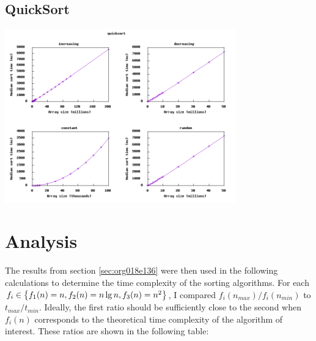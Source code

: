 \documentclass[11pt]{article}
\let\originalleft\left
\let\originalright\right
\renewcommand{\left}{\mathopen{}\mathclose\bgroup\originalleft}
\renewcommand{\right}{\aftergroup\egroup\originalright}
\begin{document}
\subsection{QuickSort}
\label{sec:org47cd91a}
\begin{center}
\includegraphics[width=10cm]{./output/quicksort.png}
\end{center}

\section{Analysis}
\label{sec:orgc51d159}

The results from section \ref{sec:org018e136} were then used in the following calculations to determine the
time complexity of the sorting algorithms. For each
\(f_i \in \left\{ f_1(n) = n, f_2(n) = n \lg n, f_3(n) = n^2 \right\}\),
I compared \(f_i(n_{max})/f_i(n_{min})\) to \(t_{max}/t_{min}\). Ideally, the first ratio should
be sufficiently close to the second when \(f_i(n)\) corresponds to the theoretical time complexity
of the algorithm of interest. These ratios are shown in the following table:
\end{document}
